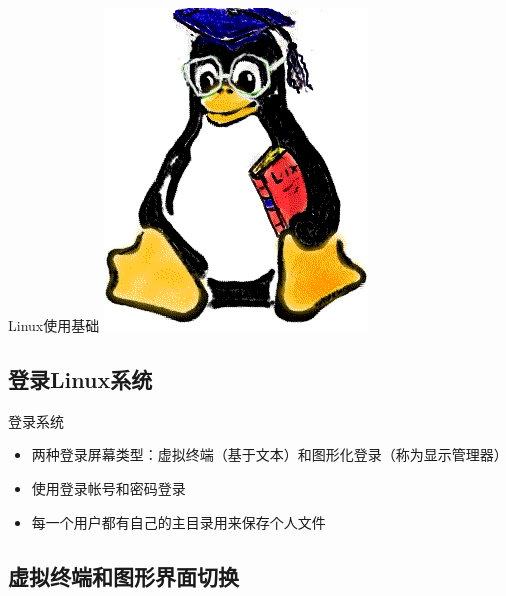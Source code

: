 \begin{frame}{Linux使用基础}
\center \includegraphics[scale=.6]{images/tux.png}

\end{frame}

\subsection{登录Linux系统}

\begin{frame}{登录系统}
\begin{itemize}
\item 两种登录屏幕类型：虚拟终端（基于文本）和图形化登录（称为显示管理器）
\item 使用登录帐号和密码登录
\item 每一个用户都有自己的主目录用来保存个人文件
\end{itemize}

\end{frame}

\subsection{虚拟终端和图形界面切换}


